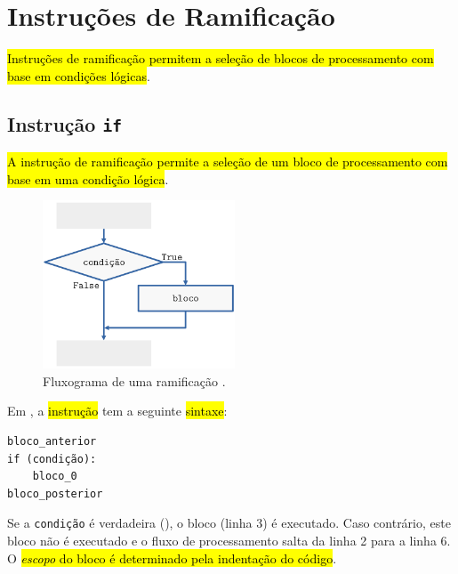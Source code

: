 \section{Instruções de Ramificação}\label{cap_progest_sec_ramifica}

\hl{Instruções de ramificação permitem a seleção de blocos de processamento com base em condições lógicas}.

\subsection{Instrução \texttt{if}}

\hl{A instrução de ramificação {\PYTHONif} permite a seleção de um bloco de processamento com base em uma condição lógica}.

\begin{figure}[H]
  \centering
  \includegraphics[width=2.25in]{./cap_progest/dados/fig_fg_if/fig.png}
  \caption{Fluxograma de uma ramificação {\PYTHONif}.}
  \label{cap_progest_sec_ramifica:fig:fg_if}
\end{figure}

Em {\python}, a \hl{instrução {\PYTHONif}} tem a seguinte \hl{sintaxe}:

\begin{lstlisting}
bloco_anterior
if (condição):
    bloco_0
bloco_posterior
\end{lstlisting}

Se a {\lstinline+condição+} é verdadeira ({\PYTHONTrue}), o bloco (linha 3) é executado. Caso contrário, este bloco não é executado e o fluxo de processamento salta da linha 2 para a linha 6. O \hl{\emph{escopo} do bloco {\PYTHONif} é determinado pela indentação do código}.

